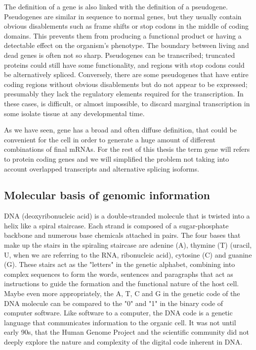 The definition of a gene is also linked with the definition of a
pseudogene. Pseudogenes are similar in sequence to normal genes, but
they usually contain obvious disablements such as frame shifts or stop
codons in the middle of coding domains. This prevents them from
producing a functional product or having a detectable effect on the
organism's phenotype. The boundary between living and dead genes is
often not so sharp. Pseudogenes can be transcribed; truncated proteins
could still have some functionality, and regions with stop codons
could be alternatively spliced. Conversely, there are some pseudogenes
that have entire coding regions without obvious disablements but do
not appear to be expressed; presumably they lack the regulatory
elements required for the transcription. In these cases, is difficult,
or almost impossible, to discard marginal transcription in some
isolate tissue at any developmental time.

As we have seen, gene has a broad and often diffuse definition, that
could be convenient for the cell in order to generate a huge amount of
different combinations of final mRNAs. For the rest of this thesis the
term gene will refers to protein coding genes and we will simplified
the problem not taking into account overlapped transcripts and
alternative splicing isoforms. 


\subsection{Molecular basis of genomic information}

DNA (deoxyribonucleic acid) is a double-stranded molecule that is
twisted into a helix like a spiral staircase. Each strand is composed
of a sugar-phosphate backbone and numerous base chemicals attached in
pairs. The four bases that make up the stairs in the spiraling
staircase are adenine (A), thymine (T) (uracil, U, when we are
referring to the RNA, ribonucleic acid), cytosine (C) and guanine
(G). These stairs act as the "letters" in the genetic alphabet,
combining into complex sequences to form the words, sentences and
paragraphs that act as instructions to guide the formation and the
functional nature of the host cell. Maybe even more appropriately, the
A, T, C and G in the genetic code of the DNA molecule can be compared
to the "0" and "1" in the binary code of computer software. Like
software to a computer, the DNA code is a genetic language that
communicates information to the organic cell. It was not until early
90s, that the Human Genome Project and the scientific community did
not deeply explore the nature and complexity of the digital code
inherent in DNA.


